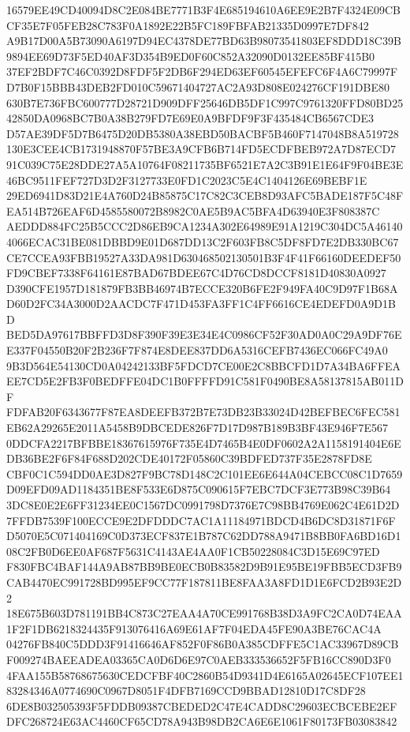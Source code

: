 \documentclass[UTF8,fontset=fandol,zihao=-4,a4paper]{ctexart}
\begin{document}
{{16579EE49CD40094D8C2E084BE7771B3F4E685194610A6EE9E2B7F4324E09CBCF35E7F05FEB28C783F0A1892E22B5FC189FBFAB21335D0997E7DF842
A9B17D00A5B73090A6197D94EC4378DE77BD63B98073541803EF8DDD18C39B9894EE69D73F5ED40AF3D354B9ED0F60C852A32090D0132EE85BF415B0
37EF2BDF7C46C0392D8FDF5F2DB6F294ED63EF60545EFEFC6F4A6C79997FD7B0F15BBB43DEB2FD010C59671404727AC2A93D808E024276CF191DBE80
630B7E736FBC600777D28721D909DFF25646DB5DF1C997C9761320FFD80BD2542850DA0968BC7B0A38B279FD7E69E0A9BFDF9F3F435484CB6567CDE3
D57AE39DF5D7B6475D20DB5380A38EBD50BACBF5B460F7147048B8A519728130E3CEE4CB1731948870F57BE3A9CFB6B714FD5ECDFBEB972A7D87ECD7
91C039C75E28DDE27A5A10764F08211735BF6521E7A2C3B91E1E64F9F04BE3E46BC9511FEF727D3D2F3127733E0FD1C2023C5E4C1404126E69BEBF1E
29ED6941D83D21E4A760D24B85875C17C82C3CEB8D93AFC5BADE187F5C48FEA514B726EAF6D4585580072B8982C0AE5B9AC5BFA4D63940E3F808387C
AEDDD884FC25B5CCC2D86EB9CA1234A302E64989E91A1219C304DC5A461404066ECAC31BE081DBBD9E01D687DD13C2F603FB8C5DF8FD7E2DB330BC67
CE7CCEA93FBB19527A33DA981D630468502130501B3F4F41F66160DEEDEF50FD9CBEF7338F64161E87BAD67BDEE67C4D76CD8DCCF8181D40830A0927
D390CFE1957D181879FB3BB46974B7ECCE320B6FE2F949FA40C9D97F1B68AD60D2FC34A3000D2AACDC7F471D453FA3FF1C4FF6616CE4EDEFD0A9D1BD
BED5DA97617BBFFD3D8F390F39E3E34E4C0986CF52F30AD0A0C29A9DF76EE337F04550B20F2B236F7F874E8DEE837DD6A5316CEFB7436EC066FC49A0
9B3D564E54130CD0A04242133BF5FDCD7CE00E2C8BBCFD1D7A34BA6FFEAEE7CD5E2FB3F0BEDFFE04DC1B0FFFFD91C581F0490BE8A58137815AB011DF
FDFAB20F6343677F87EA8DEEFB372B7E73DB23B33024D42BEFBEC6FEC581EB62A29265E2011A5458B9DBCEDE826F7D17D987B189B3BF43E946F7E567
0DDCFA2217BFBBE18367615976F735E4D7465B4E0DF0602A2A1158191404E6EDB36BE2F6F84F688D202CDE40172F05860C39BDFED737F35E2878FD8E
CBF0C1C594DD0AE3D827F9BC78D148C2C101EE6E644A04CEBCC08C1D7659D09EFD09AD1184351BE8F533E6D875C090615F7EBC7DCF3E773B98C39B64
3DC8E0E2E6FF31234EE0C1567DC0991798D7376E7C98BB4769E062C4E61D2D7FFDB7539F100ECCE9E2DFDDDC7AC1A11184971BDCD4B6DC8D31871F6F
D5070E5C071404169C0D373ECF837E1B787C62DD788A9471B8BB0FA6BD16D108C2FB0D6EE0AF687F5631C4143AE4AA0F1CB50228084C3D15E69C97ED
F830FBC4BAF144A9AB87BB9BE0ECB0B83582D9B91E95BE19FBB5ECD3FB9CAB4470EC991728BD995EF9CC77F187811BE8FAA3A8FD1D1E6FCD2B93E2D2
18E675B603D781191BB4C873C27EAA4A70CE991768B38D3A9FC2CA0D74EAA1F2F1DB6218324435F913076416A69E61AF7F04EDA45FE90A3BE76CAC4A
04276FB840C5DDD3F91416646AF852F0F86B0A385CDFFE5C1AC33967D89CBF009274BAEEADEA03365CA0D6D6E97C0AEB333536652F5FB16CC890D3F0
4FAA155B58768675630CEDCFBF40C2860B54D9341D4E6165A02645ECF107EE183284346A0774690C0967D8051F4DFB7169CCD9BBAD12810D17C8DF28
6DE8B032505393F5FDDB09387CBEDED2C47E4CADD8C29603ECBCEBE2EFDFC268724E63AC4460CF65CD78A943B98DB2CA6E6E1061F80173FB03083842
}}
\end{document}
